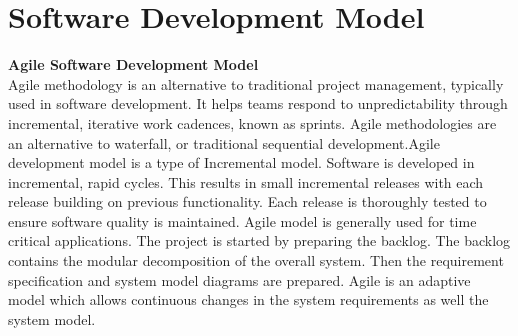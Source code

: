 \section{Software Development Model}
\textbf{Agile Software Development Model}\\
Agile methodology is an alternative to traditional project management, typically used in software development. It helps teams respond to unpredictability through incremental, iterative work cadences, known as sprints. Agile methodologies are an alternative to waterfall, or traditional sequential development.Agile development model is a type of Incremental model. Software is developed in incremental, rapid cycles. This results in small incremental releases with each release building on
previous functionality. Each release is thoroughly tested to ensure software quality is maintained. Agile model is generally used for time critical applications. The project is started by preparing the backlog. The backlog contains the modular decomposition of the overall system. Then the requirement specification and system model diagrams are prepared. Agile
is an adaptive model which allows continuous changes in the system requirements as well the system model.
